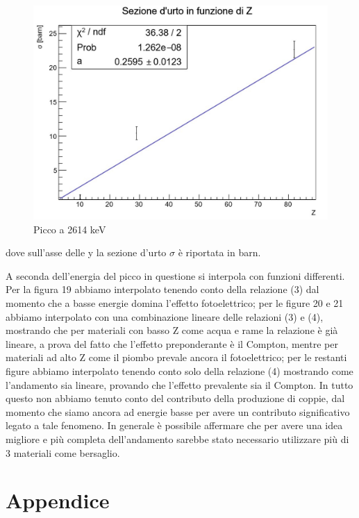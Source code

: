 \documentclass[a4paper,10pt]{article}
\begin{document}
\begin{figure}[H]
    \centering
    \includegraphics[scale=0.6]{grafici/picco2614}
    \caption{Picco a 2614 keV}
\end{figure}

\noindent dove sull'asse delle y la sezione d'urto $\sigma$ è riportata in barn.

\noindent A seconda dell'energia del picco in questione si interpola con funzioni differenti. Per la figura 19 abbiamo interpolato tenendo conto della relazione (3) dal momento che a basse energie domina l'effetto fotoelettrico; per le figure 20 e 21 abbiamo interpolato con una combinazione lineare delle relazioni (3) e (4), mostrando che per materiali con basso Z come acqua e rame la relazione \`e gi\`a lineare, a prova del fatto che l'effetto preponderante \`e il Compton, mentre per materiali ad alto Z come il piombo prevale ancora il fotoelettrico; per le restanti figure abbiamo interpolato tenendo conto solo della relazione (4) mostrando come l'andamento sia lineare, provando che l'effetto prevalente sia il Compton. In tutto questo non abbiamo tenuto conto del contributo della produzione di coppie, dal momento che siamo ancora ad energie basse per avere un contributo significativo legato a tale fenomeno. In generale \`e possibile affermare che per avere una idea migliore e pi\`u completa dell'andamento sarebbe stato necessario utilizzare pi\`u di 3 materiali come bersaglio. 


\section{Appendice}
\end{document}
